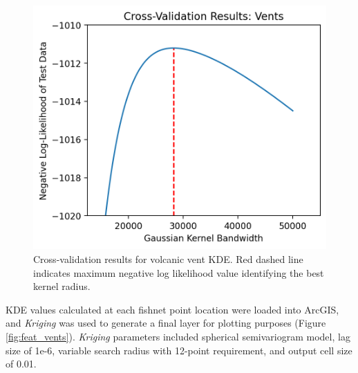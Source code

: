 \begin{figure}[H]
\centering
\includegraphics[scale=.60]{templates/images/Figure-Vents_kde_gridsearchcv_result.png}
\caption[Volcanic vent density parameter tuning]{Cross-validation results for volcanic vent KDE. Red dashed line indicates maximum negative log likelihood value identifying the best kernel radius.}
\label{fig:vent_cv}
\end{figure}

KDE values calculated at each fishnet point location were loaded into ArcGIS, and \textit{Kriging} was used to generate a final layer for plotting purposes (Figure \ref{fig:feat_vents}). \textit{Kriging} parameters included spherical semivariogram model, lag size of 1e-6, variable search radius with 12-point requirement, and output cell size of 0.01. 
\vfill
\pagebreak

